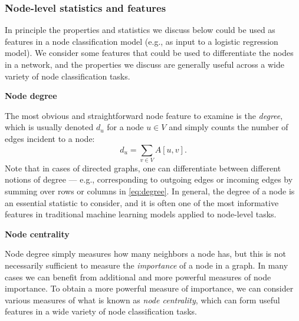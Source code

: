 \documentclass[10pt]{book}
\let\defaultmarginpar\marginpar
\renewcommand\marginpar[2][]{\defaultmarginpar{\itshape\color{gray}#2}}
\begin{document}
\subsubsection{Node-level statistics and features}

In principle the properties and statistics we discuss below could be used as features in a node classification model (e.g., as input to a logistic regression model). We consider some features that could be used to differentiate the nodes in a network, and the properties we discuss are generally useful across a wide variety of node classification tasks.
\smallskip

\textbf{Node degree}

The most obvious and straightforward node feature to examine is the \emph{degree}\marginpar{degree}, which is usually denoted $d_u$ for a node $u \in V$ and simply counts the number of edges incident to a node:
\begin{equation}
    d_u = \sum_{v \in V} A[u, v].
    \label{eq:degree}
\end{equation}
Note that in cases of directed graphs, one can differentiate between different notions of degree --- e.g., corresponding to outgoing edges or incoming edges by summing over rows or columns in \autoref{eq:degree}. In general, the degree of a node is an essential statistic to consider, and it is often one of the most informative features in traditional machine learning models applied to node-level tasks.
\smallskip

\textbf{Node centrality}

Node degree simply measures how many neighbors a node has, but this is not necessarily sufficient to measure the \emph{importance} of a node in a graph. In many cases we can benefit from additional and more powerful measures of node importance. To obtain a more powerful measure of importance, we can consider various measures of what is known as \emph{node centrality}\marginpar{node centrality}, which can form useful features in a wide variety of node classification tasks.
\end{document}

